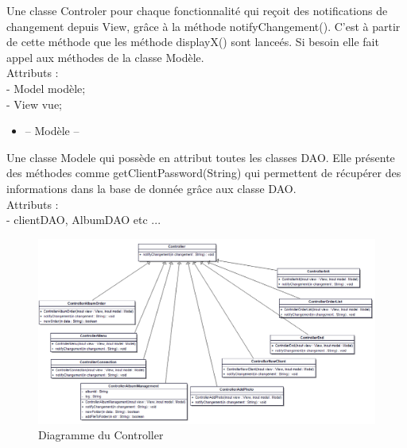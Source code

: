 \documentclass{article}
\begin{document}
\begin{flushleft}
Une classe Controler pour chaque fonctionnalité qui reçoit des notifications
de changement depuis View, grâce à la méthode notifyChangement(). C'est à
partir de cette méthode que les méthode displayX() sont lanceés. Si besoin
elle fait appel aux méthodes de la classe Modèle.\\
Attributs :\\

- Model modèle;\\
- View vue;\\

\vspace{1\baselineskip}
\begin{itemize}
  \item -- Modèle --
\end{itemize}

Une classe Modele qui possède en attribut toutes les classes DAO. Elle
présente des méthodes comme getClientPassword(String) qui permettent de
récupérer des informations dans la base de donnée grâce aux classe DAO.\\
Attributs :\\
- clientDAO, AlbumDAO etc ...
\vspace{1\baselineskip}

\begin{figure}[!h]
  \begin{center}
    \includegraphics[scale=0.45]{fig6} %
    \caption{Diagramme du Controller}
  \end{center}
\end{figure}


\end{flushleft}
\end{document}
